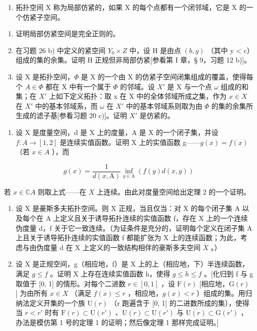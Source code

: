 \begin{enumerate}
\def\labelenumi{\arabic{enumi})}
\setcounter{enumi}{26}
\tightlist
\item
  拓扑空间 X 称为局部仿紧的，如果 X 的每个点都有一个闭邻域，它是 X 的一个仿紧子空间。
\end{enumerate}

\begin{enumerate}
\def\labelenumi{\alph{enumi})}
\item
  证明局部仿紧空间是完全正则的。
\item
  在习题 26 b) 中定义的紧空间 \(Y_{0} \times Z\) 中，设 H 是由点 \((b, y)\) （其中 y \textless{} c）组成的集的余集。证明 H 正规但非局部仿紧{[}参看第 I 章，§ 9，习题 12 b){]}。
\item
  设 X 是拓扑空间，\(\Phi\) 是 X 的一个由 X 的仿紧子空间闭集组成的覆盖，使得每个 \(A \in \Phi\) 都在 X 中有一个属于 \(\Phi\) 的邻域。设 \(X'\) 是 X 与一个点 \(\omega\) 组成的和集；在 \(X'\) 上如下定义拓扑：取 x 在 X 中的全体邻域所成之集，作为 \(x \in X\) 在 \(X'\) 中的基本邻域系，而 \(\omega\) 在 \(X'\) 中的基本邻域系则取为由 \(\Phi\) 的集的余集所生成的滤子基{[}参看习题 20 c){]}。证明 \(X'\) 是仿紧的。
\end{enumerate}

\begin{enumerate}
\def\labelenumi{\arabic{enumi})}
\setcounter{enumi}{27}
\tightlist
\item
  设 X 是度量空间，d 是 X 上的度量，A 是 X 的一个闭子集，并设 \(f: A \to [1, 2]\) 是连续实值函数。证明 X 上的实值函数 g——\(g(x) = f(x)\) （若 \(x \in A\) ），而
\end{enumerate}

\[
g (x) = \frac {\mathrm{1}}{d (x , \mathrm{A})} \inf _ {y \in \mathrm{A}} (f (y) d (x, y))
\]

若 \(x \in \mathbb{C}A\) 则取上式——在 \(X\) 上连续。由此对度量空间给出定理 2 的一个证明。

\begin{enumerate}
\def\labelenumi{\arabic{enumi})}
\setcounter{enumi}{28}
\item
  设 X 是豪斯多夫拓扑空间。则 X 正规，当且仅当：对 X 的每个闭子集 A 以及每个在 A 上定义且关于诱导拓扑连续的实值函数 f，存在 X 上的一个连续伪度量 d，f 关于它一致连续。（为证条件是充分的，证明每个定义在闭子集 A 上且关于诱导拓扑连续的实值函数 f 都能扩张为 X 上的连续函数；为此，考虑与由伪度量 d 在 X 上定义的一致结构相伴的豪斯多夫空间 \(\overline{X}\) 。）
\item
  设 X 是正规空间，g（相应地，f）是 X 上的上（相应地，下）半连续函数，满足 \(g \leqslant f\) 。证明 X 上存在连续实值函数 h，使得 \(g \leqslant h \leqslant f\) 。{[}化归到 f 与 g 取值于 {[}0, 1{]} 的情形。对每个二进数 \(r \in [0, 1]\) ，设 \(\mathrm{F}(r)\) {[}相应地，\(\mathrm{G}(r)\) {]} 为由所有 \(x \in X\) （满足 \(f(x) \leqslant r\) ，相应地，\(g(x) < r\) ）组成的集。用归纳法定义开集的一个族 \(\mathrm{U}(r)\) （r 跑遍含于 {[}0, 1{]} 的二进数所成的集），使得当 \(r < r'\) 时有 \(\mathrm{F}(r) \subset \mathrm{U}(r')\) 、\(\overline{\mathrm{U}(r)} \subset \mathrm{U}(r')\) 与 \(\overline{\mathrm{U}(r)} \subset \mathrm{G}(r')\) ，办法是模仿第 1 号的定理 1 的证明；然后像定理 1 那样完成证明。{]}
\end{enumerate}
